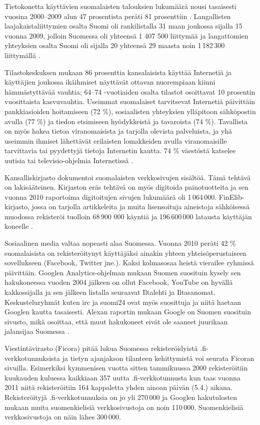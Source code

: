 \begin{multicols}{2}
Tietokonetta käyttävien suomalaisten talouksien lukumäärä nousi tasaisesti vuosina 2000--2009 alun 47 prosentista peräti 81 prosenttiin \cite{OECD-ICT}. Langallisten laajakaistaliittymien osalta Suomi oli rankilistalla 31 maan joukossa sijalla 15 vuonna 2009, jolloin Suomessa oli yhteensä 1 407 500 liittymää \cite{OECD-wired} ja langattomien yhteyksien osalta Suomi oli sijalla 20 yhteensä 29 maasta noin 1\,182\,300 liittymällä \cite{OECD-mobile}.  

Tilastokeskuksen mukaan 86 prosenttia kansalaisista käyttää Internetiä ja käyttäjien joukossa ikäihmiset näyttävät ottavan nuorempiaan kiinni hämmästyttävää vauhtia; 64--74 -vuotiaiden osalta tilastot osoittavat 10 prosentin vuosittaista kasvuvauhtia. Useimmat suomalaiset tarvitsevat Internetiä päivittäin pankkiasioiden hoitamiseen (72 \%), sosiaalisten yhteyksien ylläpitoon sähköpostin avulla (77 \%) ja tiedon etsimiseen hyödykkeistä ja tavaroista (74 \%). Tavallista on myös hakea tietoa viranomaisista ja tarjolla olevista palveluista, ja yhä useimmin ihmiset lähettävät erilaisten lomakkeiden avulla viranomaisille tarvittavia tai pyydettyjä tietoja Internetin kautta. 74 \% väestöstä katselee uutisia tai televisio-ohjelmia Internetissä \cite{SVT}.

Kansalliskirjasto dokumentoi suomalaisten verkkosivujen sisältöä. Tämä tehtävä on lakisääteinen. Kirjaston eräs tehtävä on myös digitoida painotuotteita ja sen vuonna 2010 raportoima digitoitujen sivujen lukumäärä oli 1\,064\,000.  FinElib-kirjasto, jossa on tarjolla artikkeleita ja muita lisensoituja aineistoja sähköisessä muodossa rekisteröi tuolloin 68\,900 000 käyntiä ja 196\,600\,000 latausta käyttäjän koneelle \cite{natlibstat}.

Sosiaalinen media valtaa nopeasti alaa Suomessa. Vuonna 2010 peräti 42 \% suomalaisista on rekisteröitynyt käyttäjäksi ainakin yhteen yhteisöperustaiseen sovellukseen (Facebook, Twitter jne.). Kaksi kolmasosaa heistä vierailee ryhmissä päivittäin. Googlen Analytics-ohjelman mukaan Suomen suosituin kysely sen hakukoneessa vuoden 2004 jälkeen on ollut Facebook, YouTube on hyvällä kakkossijalla ja sen jälkeen listalla seuraavat Iltalehti ja Iltasanomat. Keskusteluryhmät kuten irc ja suomi24 ovat myös suosittuja ja niitä haetaan Googlen kautta tasaisesti. Alexan raportin mukaan Google on Suomen suosituin sivusto, mikä osoittaa, että muut hakukoneet eivät ole saaneet juurikaan jalansijaa Suomessa \cite{topsites}.

Viestintävirasto (Ficora) pitää lukua Suomessa rekisteröidyistä .fi-verkkotunnuksista ja tietyn ajanjakson tilanteen kehittymistä voi seurata Ficoran sivuilla. Esimerkiksi kymmenisen vuotta sitten tammikuussa 2000 rekisteröitiin kuukauden kuluessa kaikkiaan 357 uutta .fi-verkkotunnusta kun taas vuonna 2011 niitä rekisteröitiin 164 kappaletta yhden ainoan päivän (5.4.)  aikana. Rekisteröityjä .fi-verkkotunnuksia on jo yli 270\,000 ja Googlen hakutulosten mukaan muita suomenkielisiä verkkosivustoja on noin 110\,000.  Suomenkielisiä verkkosivustoja on näin lähes 300\,000.


\end{multicols}
